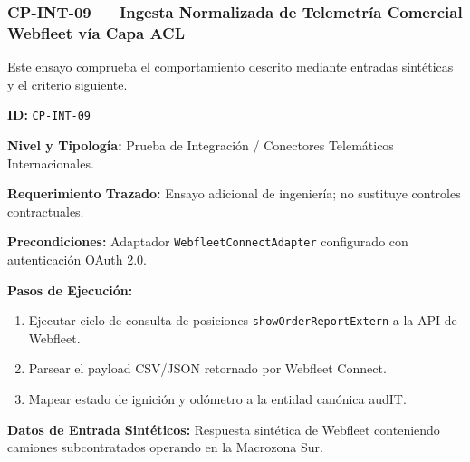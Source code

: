 \subsubsection*{CP-INT-09 — Ingesta Normalizada de Telemetría Comercial Webfleet vía Capa ACL}\label{sec:9-cp-int-09}
Este ensayo comprueba el comportamiento descrito mediante entradas sintéticas y el criterio siguiente.

\par\noindent\textbf{ID:} \texttt{C\allowbreak{}P\allowbreak{}-\allowbreak{}I\allowbreak{}N\allowbreak{}T\allowbreak{}-\allowbreak{}0\allowbreak{}9\allowbreak{}}\par
\par\noindent\textbf{Nivel y Tipología:} Prueba de Integración / Conectores Telemáticos Internacionales.\par
\par\noindent\textbf{Requerimiento Trazado:} Ensayo adicional de ingeniería; no sustituye controles contractuales.\par
\par\noindent\textbf{Precondiciones:} Adaptador \texttt{W\allowbreak{}e\allowbreak{}b\allowbreak{}f\allowbreak{}l\allowbreak{}e\allowbreak{}e\allowbreak{}t\allowbreak{}C\allowbreak{}o\allowbreak{}n\allowbreak{}n\allowbreak{}e\allowbreak{}c\allowbreak{}t\allowbreak{}A\allowbreak{}d\allowbreak{}a\allowbreak{}p\allowbreak{}t\allowbreak{}e\allowbreak{}r\allowbreak{}} configurado con autenticación OAuth 2.0.\par
\par\noindent\textbf{Pasos de Ejecución:} \par
\begin{enumerate}
\item Ejecutar ciclo de consulta de posiciones \texttt{s\allowbreak{}h\allowbreak{}o\allowbreak{}w\allowbreak{}O\allowbreak{}r\allowbreak{}d\allowbreak{}e\allowbreak{}r\allowbreak{}R\allowbreak{}e\allowbreak{}p\allowbreak{}o\allowbreak{}r\allowbreak{}t\allowbreak{}E\allowbreak{}x\allowbreak{}t\allowbreak{}e\allowbreak{}r\allowbreak{}n\allowbreak{}} a la API de Webfleet.
\item Parsear el payload CSV/JSON retornado por Webfleet Connect.
\item Mapear estado de ignición y odómetro a la entidad canónica audIT.
\end{enumerate}
\par\noindent\textbf{Datos de Entrada Sintéticos:} Respuesta sintética de Webfleet conteniendo camiones subcontratados operando en la Macrozona Sur.\par
